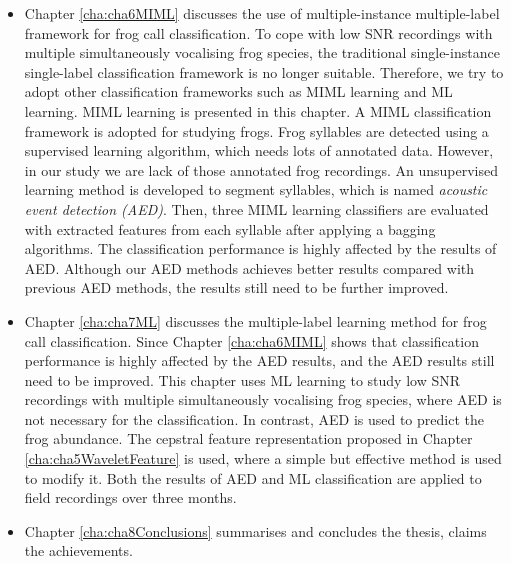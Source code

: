\begin{itemize}
\item  Chapter \ref{cha:cha6MIML} discusses the use of multiple-instance multiple-label framework for frog call classification. To cope with low SNR recordings with multiple simultaneously vocalising frog species, the traditional single-instance single-label classification framework is no longer suitable. Therefore, we try to adopt other classification frameworks such as MIML learning and ML learning. MIML learning is presented in this chapter. A MIML classification framework is adopted for studying frogs. Frog syllables are detected using a supervised learning algorithm, which needs lots of annotated data. However, in our study we are lack of those annotated frog recordings. An unsupervised learning method is developed to segment syllables, which is named \textit{acoustic event detection (AED)}. Then, three MIML learning classifiers are evaluated with extracted features from each syllable after applying a bagging algorithms. The classification performance is highly affected by the results of AED. Although our AED methods achieves better results compared with previous AED methods, the results still need to be further improved.


\item  Chapter \ref{cha:cha7ML} discusses the multiple-label learning method for frog call classification. Since Chapter \ref{cha:cha6MIML} shows that classification performance is highly affected by the AED results, and the AED results still need to be improved. This chapter uses ML learning to study low SNR recordings with multiple simultaneously vocalising frog species, where AED is not necessary for the classification. In contrast, AED is used to predict the frog abundance. The cepstral feature representation proposed in Chapter \ref{cha:cha5WaveletFeature} is used, where a simple but effective method is used to modify it. Both the results of AED and ML classification are applied to field recordings over three months. 



\item  Chapter \ref{cha:cha8Conclusions} summarises and concludes the thesis, claims the achievements.



\end{itemize}





